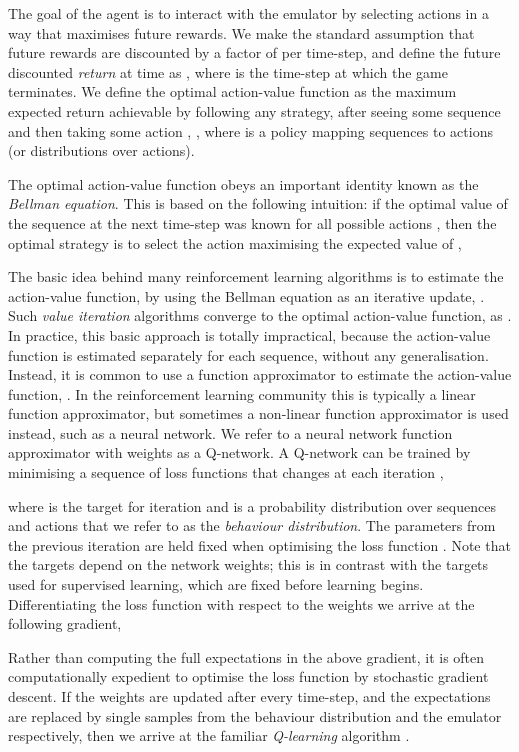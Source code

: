 \documentclass{article} \usepackage{nips13submit_e,times}
\begin{document}
The goal of the agent is to interact with the emulator by selecting actions in a way that maximises future rewards. We make the standard assumption that future rewards are discounted by a factor of  per time-step, and define the future discounted \emph{return} at time  as , where 
is the time-step at which the game terminates. We define the optimal action-value function  as the maximum expected return achievable by following any strategy, after seeing some sequence  and then taking some action , , where  is a policy mapping sequences to actions (or distributions over actions).

The optimal action-value function obeys an important identity known as the \emph{Bellman equation}. This is based on the following intuition: if the optimal value  of the sequence  at the next time-step was known for all possible actions , then the optimal strategy is to select the action  maximising the expected value of ,

The basic idea behind many reinforcement learning algorithms is to estimate the action-value function, by using the Bellman equation as an iterative update, . Such \emph{value iteration} algorithms converge to the optimal action-value function,  as  \cite{sutton:book}. In practice, this basic approach is totally impractical, because the action-value function is estimated separately for each sequence, without any generalisation. Instead, it is common to use a function approximator to estimate the action-value function, . In the reinforcement learning community this is typically a linear function approximator, but sometimes a non-linear function approximator is used instead, such as a neural network. We refer to a neural network function approximator with weights  as a Q-network. A Q-network can be trained by minimising a sequence of loss functions  that changes at each iteration ,

where  is the target for iteration  and  is a probability distribution over sequences  and actions  that we refer to as the \emph{behaviour distribution}. The parameters from the previous iteration  are held fixed when optimising the loss function . 
Note that the targets depend on the network weights; this is in contrast with the targets used for supervised learning, which are fixed before learning begins.
Differentiating the loss function with respect to the weights we arrive at the following gradient,

Rather than computing the full expectations in the above gradient, it is often computationally expedient to optimise the loss function by stochastic gradient descent. If the weights are updated after every time-step, and the expectations are replaced by single samples from the behaviour distribution  and the emulator  respectively, then we arrive at the familiar \emph{Q-learning} algorithm \cite{watkins-qlearning}. 
\end{document}

